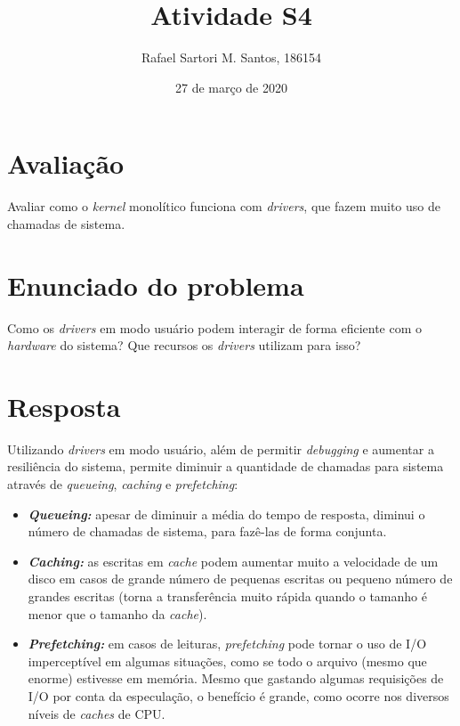 \documentclass[brazilian,a4paper]{article}
\title{Atividade S4}
\author{Rafael Sartori M. Santos, 186154}
\date{27 de março de 2020}
\begin{document}
\maketitle

\section*{Avaliação}

Avaliar como o \textit{kernel} monolítico funciona com \textit{drivers}, que fazem muito uso de chamadas de sistema.

\section*{Enunciado do problema}

Como os \textit{drivers} em modo usuário podem interagir de forma eficiente com o \textit{hardware} do sistema? Que recursos os \textit{drivers} utilizam para isso?

\section*{Resposta}

Utilizando \textit{drivers} em modo usuário, além de permitir \textit{debugging} e aumentar a resiliência do sistema, permite diminuir a quantidade de chamadas para sistema através de \textit{queueing}, \textit{caching} e \textit{prefetching}:
\begin{itemize}
    \item \textbf{\textit{Queueing:}} apesar de diminuir a média do tempo de resposta, diminui o número de chamadas de sistema, para fazê-las de forma conjunta.
    \item \textbf{\textit{Caching:}} as escritas em \textit{cache} podem aumentar muito a velocidade de um disco em casos de grande número de pequenas escritas ou pequeno número de grandes escritas (torna a transferência muito rápida quando o tamanho é menor que o tamanho da \textit{cache}).
    \item \textbf{\textit{Prefetching:}} em casos de leituras, \textit{prefetching} pode tornar o uso de I/O imperceptível em algumas situações, como se todo o arquivo (mesmo que enorme) estivesse em memória. Mesmo que gastando algumas requisições de I/O por conta da especulação, o benefício é grande, como ocorre nos diversos níveis de \textit{caches} de CPU.
\end{itemize}
\end{document}
